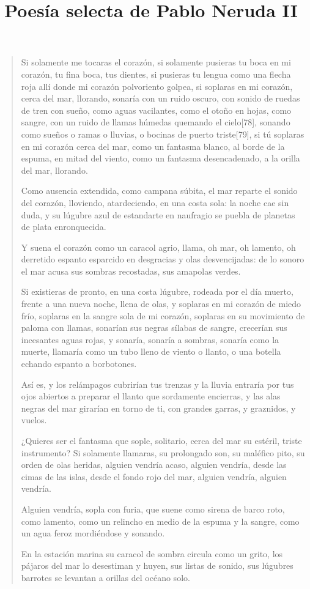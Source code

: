 \documentclass[12pt]{article}
\date{}
\title{Poesía selecta de Pablo Neruda II}
\begin{document}
\maketitle
\tableofcontents

\clearpage
{}
\begin{verse}
Si solamente me tocaras el corazón,
si solamente pusieras tu boca en mi corazón,
tu fina boca, tus dientes,
si pusieras tu lengua como una flecha roja
allí donde mi corazón polvoriento golpea,
si soplaras en mi corazón, cerca del mar, llorando,
sonaría con un ruido oscuro, con sonido de ruedas de tren con sueño,
como aguas vacilantes,
como el otoño en hojas,
como sangre,
con un ruido de llamas húmedas quemando el cielo[78],
sonando como sueños o ramas o lluvias,
o bocinas de puerto triste[79],
si tú soplaras en mi corazón cerca del mar,
como un fantasma blanco,
al borde de la espuma,
en mitad del viento,
como un fantasma desencadenado, a la orilla del mar, llorando.

Como ausencia extendida, como campana súbita,
el mar reparte el sonido del corazón,
lloviendo, atardeciendo, en una costa sola:
la noche cae sin duda,
y su lúgubre azul de estandarte en naufragio
se puebla de planetas de plata enronquecida.

Y suena el corazón como un caracol agrio,
llama, oh mar, oh lamento, oh derretido espanto
esparcido en desgracias y olas desvencijadas:
de lo sonoro el mar acusa
sus sombras recostadas, sus amapolas verdes.

Si existieras de pronto, en una costa lúgubre,
rodeada por el día muerto,
frente a una nueva noche,
llena de olas,
y soplaras en mi corazón de miedo frío,
soplaras en la sangre sola de mi corazón,
soplaras en su movimiento de paloma con llamas,
sonarían sus negras sílabas de sangre,
crecerían sus incesantes aguas rojas,
y sonaría, sonaría a sombras,
sonaría como la muerte,
llamaría como un tubo lleno de viento o llanto,
o una botella echando espanto a borbotones.

Así es, y los relámpagos cubrirían tus trenzas
y la lluvia entraría por tus ojos abiertos
a preparar el llanto que sordamente encierras,
y las alas negras del mar girarían en torno
de ti, con grandes garras, y graznidos, y vuelos.

¿Quieres ser el fantasma que sople, solitario,
cerca del mar su estéril, triste instrumento?
Si solamente llamaras,
su prolongado son, su maléfico pito,
su orden de olas heridas,
alguien vendría acaso,
alguien vendría,
desde las cimas de las islas, desde el fondo rojo del mar,
alguien vendría, alguien vendría.

Alguien vendría, sopla con furia,
que suene como sirena de barco roto,
como lamento,
como un relincho en medio de la espuma y la sangre,
como un agua feroz mordiéndose y sonando.

En la estación marina
su caracol de sombra circula como un grito,
los pájaros del mar lo desestiman y huyen,
sus listas de sonido, sus lúgubres barrotes
se levantan a orillas del océano solo.

\end{verse}
\end{document}
